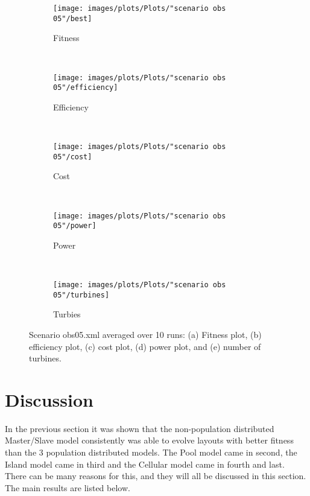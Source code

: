 \begin{figure}[h!]
    \centering
      \begin{subfigure}[b]{0.45\textwidth}
        \texttt{[image: images/plots/Plots/"scenario obs 05"/best]}
        \caption{Fitness}
        \hfill
        \label{plot:fitness plot scenario obs 05}
    \end{subfigure}
    ~
      \begin{subfigure}[b]{0.45\textwidth}
        \texttt{[image: images/plots/Plots/"scenario obs 05"/efficiency]}
        \caption{Efficiency}
        \hfill
        \label{plot:efficiency plot scenario obs 05}
    \end{subfigure}
    ~
    \begin{subfigure}[b]{0.45\textwidth}
        \texttt{[image: images/plots/Plots/"scenario obs 05"/cost]}
        \caption{Cost}
        \hfill
        \label{plot:cost plot scenario obs 05}
    \end{subfigure}
    ~
    \begin{subfigure}[b]{0.45\textwidth}
        \texttt{[image: images/plots/Plots/"scenario obs 05"/power]}
        \caption{Power}
        \hfill
        \label{plot:power plot scenario obs 05}
    \end{subfigure}
    ~
    \begin{subfigure}[b]{0.45\textwidth}
        \texttt{[image: images/plots/Plots/"scenario obs 05"/turbines]}
        \caption{Turbies}
        \hfill
        \label{plot:turbines plot scenario obs 05}
    \end{subfigure}
    \caption{Scenario obs05.xml averaged over 10 runs: (a) Fitness plot, (b) efficiency plot, (c) cost plot, (d) power plot, and (e) number of turbines.}
    \label{plot:scenario obs 05}
\end{figure}


\section{Discussion}\label{section:discussion}
\noindent In the previous section it was shown that the non-population distributed Master/Slave model consistently was able to evolve layouts with better fitness than the 3 population distributed models. The Pool model came in second, the Island model came in third and the Cellular model came in fourth and last. There can be many reasons for this, and they will all be discussed in this section. The main results are listed below.\\

